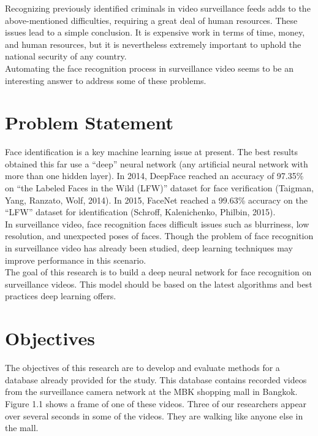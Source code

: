 Recognizing previously identified criminals in video surveillance feeds adds to the above-mentioned difficulties, requiring a great deal of human resources. These issues lead to a simple conclusion.  It is expensive work in terms of time, money, and human resources, but it is nevertheless extremely important to uphold the national security of any country.\\

Automating the face recognition process in surveillance video seems to be an interesting answer to address some of these problems.\\


\section{Problem Statement}

 Face identification is a key machine learning issue at present. The best results obtained this far use a \enquote{deep} neural network (any artificial neural network with more than one hidden layer). In 2014, DeepFace reached an accuracy of 97.35\% on \enquote{the Labeled Faces in the Wild (LFW)} dataset for face verification (Taigman, Yang, Ranzato, Wolf, 2014). In 2015, FaceNet reached a 99.63\% accuracy on the \enquote{LFW} dataset for identification (Schroff, Kalenichenko, Philbin, 2015).\\


In surveillance video, face recognition faces difficult issues such as blurriness, low resolution, and unexpected poses of faces. Though the problem of face recognition in surveillance video has already been studied, deep learning techniques may improve performance in this scenario.\\

The goal of this research is to build a deep neural network for face recognition on surveillance videos. This model should be based on the latest algorithms and best practices deep learning offers.

\section{Objectives}

The objectives of this research are to develop and evaluate methods for a database already provided for the study. This database contains recorded videos from the surveillance camera network at the MBK shopping mall in Bangkok. Figure 1.1 shows a frame of one of these videos. Three of our researchers appear over several seconds in some of the videos. They are walking like anyone else in the mall.\\


